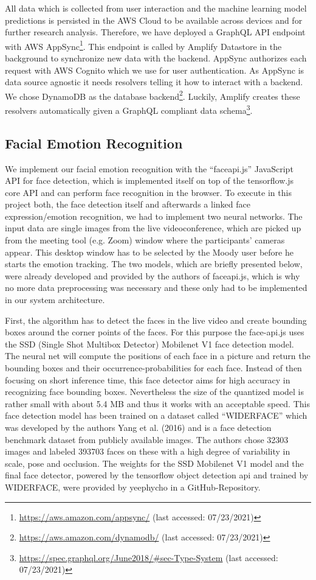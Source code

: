 All data which is collected from user interaction and the machine learning model predictions is persisted in the AWS Cloud to be available across devices and for further research analysis. Therefore, we have deployed a GraphQL API endpoint with AWS AppSync\footnote{\url{https://aws.amazon.com/appsync/} (last accessed: 07/23/2021)}. This endpoint is called by Amplify Datastore in the background to synchronize new data with the backend. AppSync authorizes each request with AWS Cognito which we use for user authentication. As AppSync is data source agnostic it needs resolvers telling it how to interact with a backend. We chose DynamoDB as the database backend\footnote{\url{https://aws.amazon.com/dynamodb/} (last accessed: 07/23/2021)}. Luckily, Amplify creates these resolvers automatically given a GraphQL compliant data schema\footnote{\url{https://spec.graphql.org/June2018/#sec-Type-System} (last accessed: 07/23/2021)}.

\subsection{Facial Emotion Recognition}
\label{subsec:method_facial_emotion_recognition}
We implement our facial emotion recognition with the “faceapi.js” JavaScript API for face detection, which is implemented itself on top of the tensorflow.js core API and can perform face recognition in the browser. To execute in this project both, the face detection itself and afterwards a linked face expression/emotion recognition, we had to implement two neural networks. The input data are single images from the live videoconference, which are picked up from the meeting tool (e.g. Zoom) window where the participants’ cameras appear. This desktop window has to be selected by the Moody user before he starts the emotion tracking. The two models, which are briefly presented below, were already developed and provided by the authors of faceapi.js, which is why no more data preprocessing was necessary and these only had to be implemented in our system architecture.

First, the algorithm has to detect the faces in the live video and create bounding boxes around the corner points of the faces. For this purpose the face-api.js uses the SSD (Single Shot Multibox Detector) Mobilenet V1 face detection model. The neural net will compute the positions of each face in a picture and return the bounding boxes and their occurrence-probabilities for each face. Instead of then focusing on short inference time, this face detector aims for high accuracy in recognizing face bounding boxes. Nevertheless the size of the quantized model is rather small with about 5.4 MB and thus it works with an acceptable speed. This face detection model has been trained on a dataset called “WIDERFACE” which was developed by the authors Yang et al. (2016) and is a face detection benchmark dataset from publicly available images. The authors chose 32303 images and labeled 393703 faces on these with a high degree of variability in scale, pose and occlusion. The weights for the SSD Mobilenet V1 model and the final face detector, powered by the tensorflow object detection api and trained by WIDERFACE, were provided by yeephycho in a GitHub-Repository.


